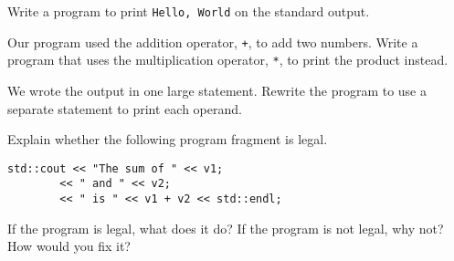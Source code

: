 %
%
\begin{question}
Write a program to print \verb|Hello, World| on the standard
output.
\end{question}

\begin{question}
Our program used the addition operator, \verb|+|, to add two
numbers. Write a program that uses the multiplication operator, \verb|*|, to print
the product instead.
\end{question}

\begin{question}
We wrote the output in one large statement. Rewrite the
program to use a separate statement to print each operand.
\end{question}

\begin{question}
Explain whether the following program fragment is legal.
\begin{lstlisting}
std::cout << "The sum of " << v1;
        << " and " << v2;
        << " is " << v1 + v2 << std::endl;
\end{lstlisting}
If the program is legal, what does it do? If the program is not legal, why
not? How would you fix it?
\end{question}
